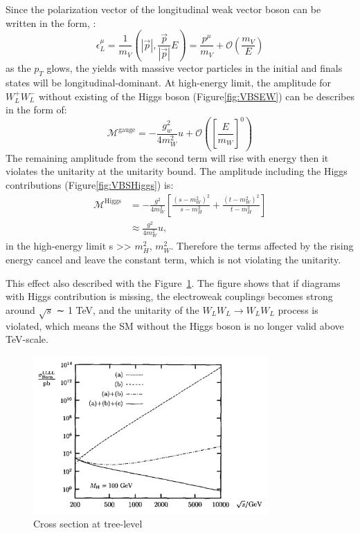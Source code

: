 Since the polarization vector of the longitudinal weak vector boson can be written in the form, \cite{Rindani_2009}: 
\begin{equation}
\epsilon_{L}^{\mu}=\frac{1}{m_{V}}\left(|\vec{p}|, \frac{\vec{p}}{|\vec{p}|} E\right)=\frac{p^{\mu}}{m_{V}}+\mathcal{O}\left(\frac{m_{V}}{E}\right)
\end{equation}
as the $p_{T}$ glows, the yields with massive vector particles in the initial and finals states will be longitudinal-dominant.
At high-energy limit, the amplitude for $W_L^+W_L^-$ without existing of the Higgs boson (Figure\ref{fig:VBSEW}) can be describes in the form of:
\begin{equation}
\mathcal{M}^{\text {gauge}}=-\frac{g_{w}^{2}}{4 m_{W}^{2}} u+\mathcal{O}\left(\left[\frac{E}{m_{W}}\right]^{0}\right)
\end{equation}
The remaining amplitude from the second term will rise with energy then it violates the unitarity at the unitarity bound. The amplitude including the Higgs contributions (Figure\ref{fig:VBSHiggs}) is:
\begin{equation}
\begin{aligned}
\mathcal{M}^{\text {Higgs}} &=-\frac{g^{2}}{4 m_{W}^{2}}\left[\frac{\left(s-m_{W}^{2}\right)^{2}}{s-m_{H}^{2}}+\frac{\left(t-m_{W}^{2}\right)^{2}}{t-m_{H}^{2}}\right] \\
& \approx \frac{g^{2}}{4 m_{W}^{2}} u,
\end{aligned}
\end{equation}
in the high-energy limit s >> $m_{H}^{2}$, $m_{W}^{2}$.
Therefore the terms affected by the rising energy cancel and leave the constant term, which is not violating the unitarity.

This effect also described with the Figure~\ref{fig:violation}.
The figure shows that if diagrams with Higgs contribution is missing, the electroweak couplings becomes strong around $\sqrt{s}$ ∼ 1 TeV, and the unitarity of the $W_LW_L \rightarrow W_LW_L$ process is violated, which means the SM without the Higgs boson is no longer valid above TeV-scale. 

\begin{figure}[tbp]
\begin{center}
 \includegraphics[width=0.80\textwidth,keepaspectratio]{figures/violation}
\caption{
Cross section at tree-level %
}
\label{fig:violation}
\end{center}
\end{figure}

